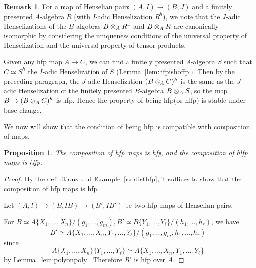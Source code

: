 \documentclass[12pt]{article}
\newcommand{\hlfp}{hlfp\xspace}
\newcommand{\hfp}{hfp\xspace}
\newtheorem{proposition}[theorem]{Proposition}
\theoremstyle{definition}
\newtheorem{remark}[theorem]{Remark}
\numberwithin{equation}{subsection}
\begin{document}
\begin{remark}\label{rmk:hlfpbasechange}
For a map of Henselian pairs $(A,I) \to (B,J)$ and a finitely presented $A$-algebra $R$ (with $I$-adic Henselization $R^h$), we note that the $J$-adic Henselizations of the $B$-algebras $B \tens_A R^h$ and $B \tens_A R$ are canonically isomorphic by considering the uniqueness conditions of the universal property of Henselization and the universal property of tensor products. 

Given any \hfp map $A \to C$, we can find a finitely presented $A$-algebra $S$ such that $C \simeq S^h$ the $I$-adic Henselization of $S$  (Lemma~\ref{lem:hfpishoffp}). Then by the preceding paragraph, the $J$-adic Henselization $(B \tens_A C)^h$ is the same as the $J$-adic Henselization of the finitely presented $B$-algebra $B \tens_A S$, so the map $B \to (B \tens_A C)^h$ is \hfp. Hence the property of being \hfp (or \hlfp) is stable under base change.
\end{remark}


We now will show that the condition of being \hfp is compatible with composition of maps.

\begin{proposition}\label{prop:hfpcomp} The composition of \hfp maps is \hfp, and the composition of \hlfp maps is \hlfp.
\end{proposition}
\begin{proof} By the definitions and Example~\ref{ex:disthfp}, it suffices to show that the composition of \hfp maps is \hfp.

Let $(A,I) \to (B,IB) \to (B',IB')$ be two \hfp maps of Henselian pairs. 

For $B \simeq A\{X_1,\dots,X_n\}/(g_1,\dots,g_m), B' \simeq B\{Y_1,\dots,Y_\ell\}/(h_1,\dots,h_r)$, we have $$B' \simeq A\{X_1,\dots,X_n,Y_1,\dots,Y_\ell\}/(g_1,\dots,g_m,h_1,\dots,h_r)$$ since $$A\{X_1,\dots,X_n\}\{Y_1,\dots,Y_\ell\} \simeq A\{X_1,\dots,X_n,Y_1,\dots,Y_\ell\}$$ by Lemma~\ref{lem:polyonpoly}. Therefore $B'$ is \hfp over $A$.\end{proof}
\end{document}
